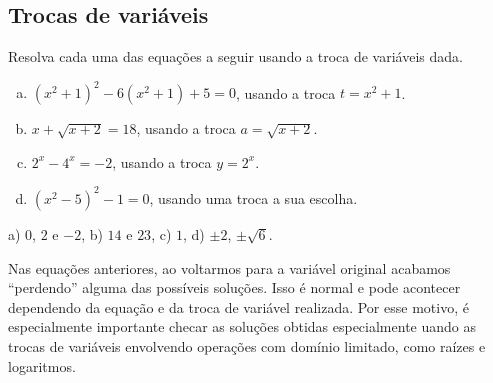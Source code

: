 \documentclass[main.tex]{subfiles}
\begin{document}
\subsection*{Trocas de variáveis}

\begin{questao}
Resolva cada uma das equações a seguir usando a troca de variáveis dada.
\begin{enumerate}[a)]
\item $(x^2+1)^2-6(x^2+1)+5=0$, usando a troca $t=x^2+1$.
\item $x+\sqrt{x+2}=18$, usando a troca $a=\sqrt{x+2}$.
\item $2^x-4^x=-2$, usando a troca $y=2^x$.
\item $(x^2-5)^2-1=0$, usando uma troca a sua escolha.
\end{enumerate}
\end{questao}


\begin{gabarito}
	\begin{gabaritoQuestao}
		a) $0$, $2$ e $-2$, b) $14$ e $23$, c) $1$, d) $\pm2$, $\pm\sqrt{6}$.
	\end{gabaritoQuestao}
\end{gabarito}

Nas equações anteriores, ao voltarmos para a variável original acabamos ``perdendo'' alguma das possíveis soluções. Isso é normal e pode acontecer dependendo da equação e da troca de variável realizada. Por esse motivo, é especialmente importante checar as soluções obtidas especialmente uando as trocas de variáveis envolvendo operações com domínio limitado, como raízes e logaritmos.
\end{document}
